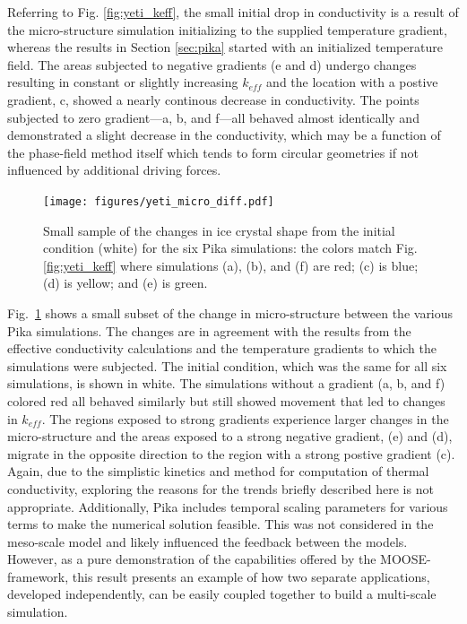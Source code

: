 Referring to Fig. \ref{fig:yeti_keff}, the small initial drop in conductivity is a result of the micro-structure simulation initializing to the supplied temperature gradient, whereas the results in Section \ref{sec:pika} started with an initialized temperature field. The areas subjected to negative gradients (e and d) undergo changes resulting in constant or slightly increasing $k_{eff}$ and the location with a postive gradient, c, showed a nearly continous decrease in conductivity. The points subjected to zero gradient---a, b, and f---all behaved almost identically and demonstrated a slight decrease in the conductivity, which may be a function of the phase-field method itself which tends to form circular geometries if not influenced by additional driving forces.

\begin{figure}[t]
  \texttt{[image: figures/yeti\_micro\_diff.pdf]}
  \caption{Small sample of the changes in ice crystal shape from the initial condition (white) for the six Pika simulations: the colors match Fig. \ref{fig:yeti_keff} where simulations (a), (b), and (f) are red; (c) is blue; (d) is yellow; and (e) is green.}
  \label{fig:yeti_micro}
\end{figure}

Fig.~\ref{fig:yeti_micro} shows a small subset of the change in micro-structure between the various Pika simulations. The changes are in agreement with the results from the effective conductivity calculations and the temperature gradients to which the simulations were subjected. The initial condition, which was the same for all six simulations, is shown in white. The simulations without a gradient (a, b, and f) colored red all behaved similarly but still showed movement that led to changes in $k_{eff}$. The regions exposed to strong gradients experience larger changes in the micro-structure and the areas exposed to a strong negative gradient, (e) and (d), migrate in the opposite direction to the region with a strong postive gradient (c). Again, due to the simplistic kinetics and method for computation of thermal conductivity, exploring the reasons for the trends briefly described here is not appropriate. Additionally, Pika includes temporal scaling parameters for various terms to make the numerical solution feasible. This was not considered in the meso-scale model and likely influenced the feedback between the models. However, as a pure demonstration of the capabilities offered by the MOOSE-framework, this result presents an example of how two separate applications, developed independently, can be easily coupled together to build a multi-scale simulation.


